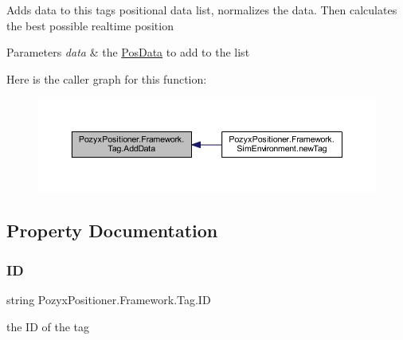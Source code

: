 Adds data to this tag\textquotesingle{}s positional data list, normalizes the data. Then calculates the best possible realtime position 


\begin{DoxyParams}{Parameters}
{\em data} & the \hyperlink{struct_pozyx_positioner_1_1_framework_1_1_pos_data}{Pos\+Data} to add to the list\\
\hline
\end{DoxyParams}
Here is the caller graph for this function\+:
\nopagebreak
\begin{figure}[H]
\begin{center}
\leavevmode
\includegraphics[width=350pt]{class_pozyx_positioner_1_1_framework_1_1_tag_ac2741e137c420ad71f64ee2d3d5fefe8_icgraph}
\end{center}
\end{figure}


\subsection{Property Documentation}
\mbox{\label{class_pozyx_positioner_1_1_framework_1_1_tag_a0d75eeca4dea7088e2b4a60230c13012}} 
\subsubsection{\texorpdfstring{ID}{ID}}
{\footnotesize\ttfamily string Pozyx\+Positioner.\+Framework.\+Tag.\+ID\hspace{0.3cm}{\ttfamily [get]}}



the ID of the tag 

\mbox{\label{class_pozyx_positioner_1_1_framework_1_1_tag_a0b1b836b4e64ae70171587a2bcde4d71}} 
